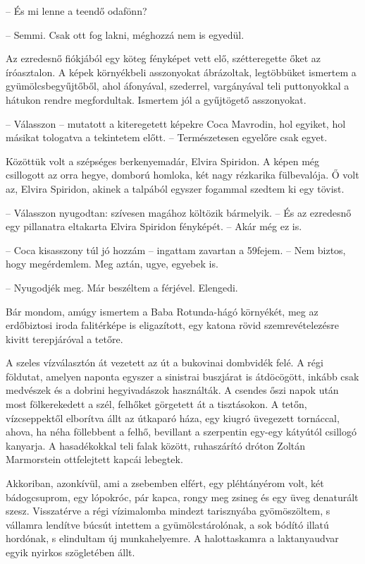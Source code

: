 \documentclass{IEEEtran}
\begin{document}
– És mi lenne a teendő odafönn?

– Semmi. Csak ott fog lakni, méghozzá nem is egyedül.

Az ezredesnő fiókjából egy köteg fényképet vett elő, szétteregette őket az
íróasztalon. A képek környékbeli asszonyokat ábrázoltak, legtöbbüket ismertem
a gyümölcsbegyűjtőből, ahol áfonyával, szederrel, vargányával teli
puttonyokkal a hátukon rendre megfordultak. Ismertem jól a gyűjtögető
asszonyokat.

– Válasszon – mutatott a kiteregetett képekre Coca Mavrodin, hol egyiket, hol
másikat tologatva a tekintetem előtt. – Természetesen egyelőre csak egyet.

Közöttük volt a szépséges berkenyemadár, Elvira Spiridon. A képen még
csillogott az orra hegye, domború homloka, két nagy rézkarika fülbevalója. Ő
volt az, Elvira Spiridon, akinek a talpából egyszer fogammal szedtem ki egy
tövist.

– Válasszon nyugodtan: szívesen magához költözik bármelyik. – És az ezredesnő
egy pillanatra eltakarta Elvira Spiridon fényképét. – Akár még ez is.

– Coca kisasszony túl jó hozzám – ingattam zavartan a 59fejem. – Nem biztos,
hogy megérdemlem. Meg aztán, ugye, egyebek is.

– Nyugodjék meg. Már beszéltem a férjével. Elengedi.

Bár mondom, amúgy ismertem a Baba Rotunda-hágó környékét, meg az erdőbiztosi
iroda falitérképe is eligazított, egy katona rövid szemrevételezésre kivitt
terepjáróval a tetőre.

A szeles vízválasztón át vezetett az út a bukovinai dombvidék felé. A régi
földutat, amelyen naponta egyszer a sinistrai buszjárat is átdöcögött, inkább
csak medvészek és a dobrini hegyivadászok használták. A csendes őszi napok
után most fölkerekedett a szél, felhőket görgetett át a tisztásokon. A tetőn,
vízcseppektől elborítva állt az útkaparó háza, egy kiugró üvegezett tornáccal,
ahova, ha néha föllebbent a felhő, bevillant a szerpentin egy-egy kátyútól
csillogó kanyarja. A hasadékokkal teli falak között, ruhaszárító dróton Zoltán
Marmorstein ottfelejtett kapcái lebegtek.

Akkoriban, azonkívül, ami a zsebemben elfért, egy pléhtányérom volt, két
bádogcsuprom, egy lópokróc, pár kapca, rongy meg zsineg és egy üveg denaturált
szesz. Visszatérve a régi vízimalomba mindezt tarisznyába gyömöszöltem, s
vállamra lendítve búcsút intettem a gyümölcstárolónak, a sok bódító illatú
hordónak, s elindultam új munkahelyemre. A halottaskamra a laktanyaudvar egyik
nyirkos szögletében állt.
\end{document}
